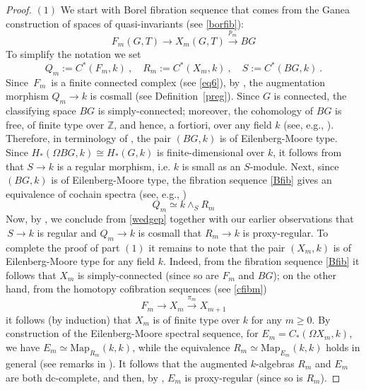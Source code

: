 \documentclass[11pt]{amsart}
\theoremstyle{definition}
\theoremstyle{remark}
\numberwithin{equation}{section}
\newcommand{\la}{\label}
\newcommand{\Map}{\mathrm{Map}}
\def\Z{\mathbb{Z}}
\begin{document}
\begin{proof}
$(1)$ We start with Borel fibration sequence that comes from the Ganea construction of spaces of quasi-invariants (see \eqref{borfib}):
%
\begin{equation}
\la{Bfib}
F_m(G,T) \to X_m(G,T) \xrightarrow{p_m} BG     
\end{equation}
%
To simplify the notation we set
$$
Q_m := C^*(F_m, k)\ ,\quad 
R_m := C^*(X_m, k)\ , \quad 
S := C^*(BG, k)\ .
$$
%
Since $\,F_m\,$ is a finite connected complex (see \eqref{eq6}), by \cite[Prop.~5.3]{DGI06}, the augmentation morphism $ Q_m \to k $ is cosmall (see Definition~\ref{preg}). Since $G$ is connected,
the classifying space $ BG $ is simply-connected; moreover, the cohomology of $BG$ is free, of finite type over $\Z$, and hence, a fortiori, over any field $k$ (see, e.g., \cite[III.3.17]{MT78}). Therefore, in terminology of \cite[Sect. 4.22]{DGI06}, the pair $(BG, k)$ is of Eilenberg-Moore type. Since $ H_*(\Omega BG, k) \cong 
H_*(G, k) $ is  finite-dimensional over $k$, it follows from \cite[5.5(3)]{DGI06} that $ S \to k $ is a 
regular morphism, i.e. $k$ is small as an $S$-module. Next, since $(BG, k)$ is of Eilenberg-Moore type,
the fibration sequence \eqref{Bfib} gives an equivalence of cochain spectra (see, e.g., \cite[Lemma 3.7]{BCHV21})
%
\begin{equation}
\la{wedgep}
Q_m \simeq k \wedge_S R_m 
\end{equation}
%
Now, by \cite[Prop.~4.18(1)]{DGI06}, we conclude from \eqref{wedgep} together with our earlier observations 
that $\,S \to k $ is regular and $ Q_m \to k $ is cosmall that $ R_m \to k $ is proxy-regular.
To complete the proof of part $(1) $ it remains to note that the pair $(X_m, k)$ is of Eilenberg-Moore
type for any field $k$. Indeed, from the fibration sequence \eqref{Bfib} it follows that  
$X_m$ is simply-connected (since so are $F_m$ and $BG$); on the other hand, from the homotopy cofibration sequences (see \eqref{cfibm})
%
$$ 
F_m \to X_m \xrightarrow{\pi_m} X_{m+1} 
$$
%
it follows (by induction) that 
$X_m$ is of finite type over $k$ for any $m \ge 0$. By construction of the Eilenberg-Moore
spectral sequence, for $ E_m = C_*(\Omega X_m, k)$, we have $ E_m \simeq \Map_{R_m}(k,k) $, while the
equivalence $ R_m \simeq \Map_{E_m}(k,k) $ holds in general (see remarks in \cite[Sect. 4.22]{DGI06}).
It follows that the augmented $k$-algebras $ R_m $ and $ E_m $ are both dc-complete, and then,
by \cite[Prop. 4.17]{DGI06}, $ E_m $ is proxy-regular (since so is $R_m$).



\end{proof}
\end{document}
